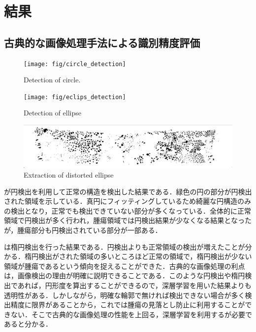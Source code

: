 
\chapter{結果}\label{chap_result}

\section{古典的な画像処理手法による識別精度評価}
\begin{figure}[H]
	\centering
	\texttt{[image: fig/circle\_detection]}
	\caption{Detection of circle.}
	\label{fig:circle_detection}
\end{figure}

\begin{figure}[H]
	\centering
	\texttt{[image: fig/eclips\_detection]}
	\caption{Detection of ellipse}
	\label{fig:ellipse_detection}
\end{figure}

\begin{figure}[H]
	\centering
	\includegraphics[width=\linewidth]{fig/chapter4/circle_extraction}
	\caption{Extraction of distorted  ellipse}
	\label{fig:ellipse_extraction}
\end{figure}

が円検出を利用して正常の構造を検出した結果である．緑色の円の部分が円検出された領域を示している．真円にフィッティングしているため綺麗な円構造のみの検出となり，正常でも検出できていない部分が多くなっている．全体的に正常領域で円検出が多く行われ，腫瘍領域では円検出結果が少なくなる結果となったが，腫瘍部分も円検出されている部分が一部ある．

は楕円検出を行った結果である．円検出よりも正常領域の検出が増えたことが分かる．楕円検出がされた領域の多いところほど正常の領域で，楕円検出が少ない領域が腫瘍であるという傾向を捉えることができた．古典的な画像処理の利点は，画像検出の理由が明確に説明できることである．このような円検出や楕円検出であれば，円形度を算出することができるので，深層学習を用いた結果よりも透明性がある．しかしながら，明確な輪郭で無ければ検出できない場合が多く検出精度に限界があることから，これでは腫瘍の見落とし防止に利用することができない．そこで古典的な画像処理の性能を上回る，深層学習を利用するが必要であると分かる．


